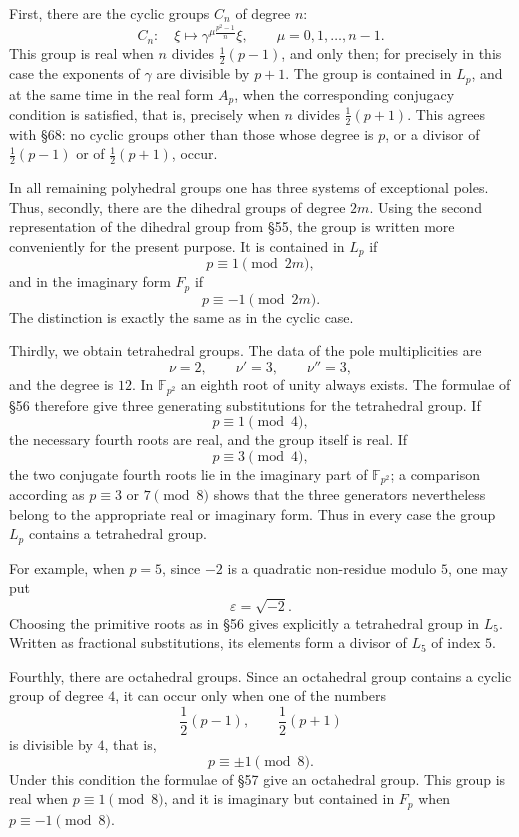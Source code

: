 \documentclass[12pt,a4paper]{article}
\newcommand{\F}{\mathbb F}
\begin{document}
First, there are the cyclic groups \(C_n\) of degree \(n\):
\[
 C_n:\quad
 \xi\longmapsto \gamma^{\mu\frac{p^2-1}{n}}\xi,\qquad
 \mu=0,1,\ldots,n-1 .
\]
This group is real when \(n\) divides \(\frac12(p-1)\), and only then; for precisely in this case the exponents of \(\gamma\) are divisible by \(p+1\).  The group is contained in \(L_p\), and at the same time in the real form \(A_p\), when the corresponding conjugacy condition is satisfied, that is, precisely when \(n\) divides \(\frac12(p+1)\).  This agrees with \S 68: no cyclic groups other than those whose degree is \(p\), or a divisor of \(\frac12(p-1)\) or of \(\frac12(p+1)\), occur.

In all remaining polyhedral groups one has three systems of exceptional poles.  Thus, secondly, there are the dihedral groups of degree \(2m\).  Using the second representation of the dihedral group from \S 55, the group is written more conveniently for the present purpose.  It is contained in \(L_p\) if
\[
 p\equiv 1\pmod {2m},
\]
and in the imaginary form \(F_p\) if
\[
 p\equiv -1\pmod {2m}.
\]
The distinction is exactly the same as in the cyclic case.

Thirdly, we obtain tetrahedral groups.  The data of the pole multiplicities are
\[
 \nu=2,\qquad \nu'=3,\qquad \nu''=3,
\]
and the degree is \(12\).  In \(\F_{p^2}\) an eighth root of unity always exists.  The formulae of \S 56 therefore give three generating substitutions for the tetrahedral group.  If
\[
 p\equiv 1\pmod 4,
\]
the necessary fourth roots are real, and the group itself is real.  If
\[
 p\equiv 3\pmod 4,
\]
the two conjugate fourth roots lie in the imaginary part of \(\F_{p^2}\); a comparison according as \(p\equiv 3\) or \(7\pmod 8\) shows that the three generators nevertheless belong to the appropriate real or imaginary form.  Thus in every case the group \(L_p\) contains a tetrahedral group.

For example, when \(p=5\), since \(-2\) is a quadratic non-residue modulo \(5\), one may put
\[
 \varepsilon=\sqrt{-2}.
\]
Choosing the primitive roots as in \S 56 gives explicitly a tetrahedral group in \(L_5\).  Written as fractional substitutions, its elements form a divisor of \(L_5\) of index \(5\).

Fourthly, there are octahedral groups.  Since an octahedral group contains a cyclic group of degree \(4\), it can occur only when one of the numbers
\[
 \frac12(p-1),\qquad \frac12(p+1)
\]
is divisible by \(4\), that is,
\[
 p\equiv \pm1\pmod 8 .
\]
Under this condition the formulae of \S 57 give an octahedral group.  This group is real when \(p\equiv 1\pmod8\), and it is imaginary but contained in \(F_p\) when \(p\equiv -1\pmod8\).
\end{document}
